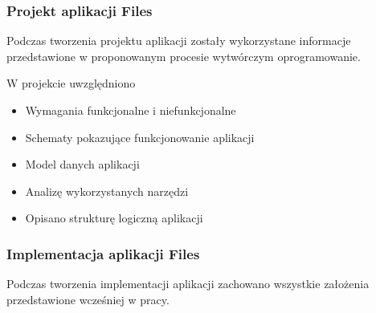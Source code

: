 \documentclass{beamer}
\begin{document}
\begin{frame}
\frametitle{Projekt aplikacji Files}
Podczas tworzenia projektu aplikacji zostały wykorzystane informacje przedstawione w proponowanym procesie wytwórczym oprogramowanie.

W projekcie uwzględniono
\begin{itemize}[<+->]
\item Wymagania funkcjonalne i niefunkcjonalne
\item Schematy pokazujące funkcjonowanie aplikacji
\item Model danych aplikacji
\item Analizę wykorzystanych narzędzi
\item Opisano strukturę logiczną aplikacji
\end{itemize}
\end{frame}

\begin{frame}
\frametitle{Implementacja aplikacji Files}
Podczas tworzenia implementacji aplikacji zachowano wszystkie założenia przedstawione wcześniej w pracy.

\end{frame}

\begin{frame}
\maketitle
\end{frame}
\end{document}
